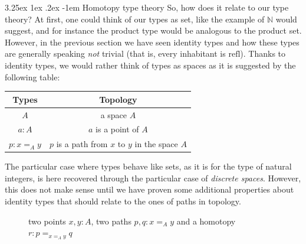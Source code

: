 \documentclass{report}
\makeatletter
\renewcommand\paragraph{\@startsection{paragraph}{5}{\z@}%
  {3.25ex \@plus1ex \@minus.2ex}%
  {-1em}%
  {\normalfont\normalsize\bfseries}}
\makeatother
\begin{document}
\paragraph{Homotopy type theory} So, how does it relate to our type theory? At first, one could think of our types as set, like the example of $\mathbb N$ would suggest, and for instance the product type would be analogous to the product set. However, in the previous section we have seen identity types and how these types are generally speaking \textit{not} trivial (that is, every inhabitant is $\mathrm{refl}$).  Thanks to identity types, we would rather think of types as spaces as it is suggested by the following table:
\begin{center}
\begin{tabular}{|c|c|}
\hline Types & Topology  \\
\hline$A$ & a space $A$   \\
\hline$a: A$ & $a$ is a point of $A$ \\
\hline $p : x=_A y$ & $p$ is a path from $x$ to $y$ in the space $A$ \\
\hline
\end{tabular}
\end{center}
The particular case where types behave like sets, as it is for the type of natural integers, is here recovered through the particular case of \textit{discrete spaces}. However, this does not make sense until we have proven some additional properties about identity types that should relate to the ones of paths in topology.
\begin{figure}[h]
  \centering
  \caption{two points $x,y : A$, two paths $p,q: x=_A y$ and a homotopy $r : p =_{x=_A y} q$}
\end{figure}
\end{document}
